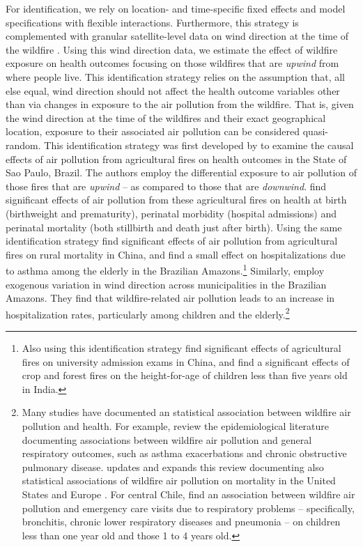 \documentclass[11pt]{article}
\begin{document}
\begin{spacing}{1.5}
For identification, we rely on location- and time-specific fixed effects and model specifications with flexible interactions. Furthermore, this strategy is complemented with granular satellite-level data on wind direction at the time of the wildfire \citep{RangelVogl2019}. Using this wind direction data, we estimate the effect of wildfire exposure on health outcomes focusing on those wildfires that are \textit{upwind} from where people live.  This identification strategy relies on the assumption that, all else equal, wind direction should not affect the health outcome variables other than via changes in exposure to the air pollution from the wildfire. That is, given the wind direction at the time of the wildfires and their exact geographical location, exposure to their associated air pollution can be considered quasi-random. This identification strategy was first developed by \cite{RangelVogl2019} to examine the causal effects of air pollution from agricultural fires on health outcomes in the State of Sao Paulo, Brazil. The authors employ the differential exposure to air pollution of those fires that are \textit{upwind} -- as compared to those that are \textit{downwind}. \cite{RangelVogl2019} find significant effects of air pollution from these agricultural fires on health at birth (birthweight and prematurity), perinatal morbidity (hospital admissions) and perinatal mortality (both stillbirth and death just after birth).  Using the same identification strategy \cite{he2020straw} find significant effects of air pollution from agricultural fires on rural mortality in China, and \cite{morello2023hospitalization} find a small effect on hospitalizations due to asthma among the elderly in the Brazilian Amazons.\footnote{Also using this identification strategy \cite{graffzivin2020unintended} find significant effects of agricultural fires on university admission exams in China, and \cite{Singh2022stubble} find a significant effects of crop and forest fires on the height-for-age of children less than five years old in India.} Similarly, \citet{rocha2022winds} employ exogenous variation in wind direction across municipalities in the Brazilian Amazons. They find that wildfire-related air pollution leads to an increase in hospitalization rates, particularly among children and the elderly.\footnote{Many studies have documented an statistical association between wildfire air pollution and health. For example, \cite{reid2016critical} review the epidemiological literature documenting associations between wildfire air pollution and general respiratory outcomes, such as asthma exacerbations and chronic obstructive pulmonary disease. \cite{cascio2018wildland} updates and expands this review documenting also statistical associations of wildfire air pollution on mortality in the United States \citep{zu2016long} and Europe \citep{kollanus2017mortality}. For central Chile, \cite{ciciretti2022relationship} find an association between wildfire air pollution and emergency care visits due to respiratory problems -- specifically, bronchitis, chronic lower respiratory diseases and pneumonia -- on children less than one year old and those 1 to 4 years old.}


\end{spacing}
\end{document}
